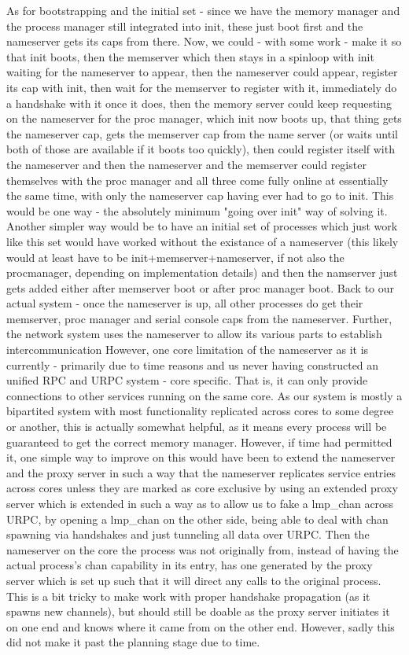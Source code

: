 As for bootstrapping and the initial set - since we have the memory manager and the process manager still integrated into init, these just boot first and the nameserver gets its caps from there. Now, we could - with some work - make it so that init boots, then the memserver which then stays in a spinloop with init waiting for the nameserver to appear, then the nameserver could appear, register its cap with init, then wait for the memserver to register with it, immediately do a handshake with it once it does, then the memory server could keep requesting on the nameserver for the proc manager, which init now boots up, that thing gets the nameserver cap, gets the memserver cap from the name server (or waits until both of those are available if it boots too quickly), then could register itself with the nameserver and then the nameserver and the memserver could register themselves with the proc manager and all three come fully online at essentially the same time, with only the nameserver cap having ever had to go to init. This would be one way - the absolutely minimum "going over init" way of solving it.
Another simpler way would be to have an initial set of processes which just work like this set would have worked without the existance of a nameserver (this likely would at least have to be init+memserver+nameserver, if not also the procmanager, depending on implementation details) and then the namserver just gets added either after memserver boot or after proc manager boot.
Back to our actual system - once the nameserver is up, all other processes do get their memserver, proc manager and serial console caps from the nameserver. Further, the network system uses the nameserver to allow its various parts to establish intercommunication
However, one core limitation of the nameserver as it is currently - primarily due to time reasons and us never having constructed an unified RPC and URPC system - core specific. That is, it can only provide connections to other services running on the same core. As our system is mostly a bipartited system with most functionality replicated across cores to some degree or another, this is actually somewhat helpful, as it means every process will be guaranteed to get the correct memory manager.
However, if time had permitted it, one simple way to improve on this would have been to extend the nameserver and the proxy server in such a way that the nameserver replicates service entries across cores unless they are marked as core exclusive by using an extended proxy server which is extended in such a way as to allow us to fake a lmp\_chan across URPC, by opening a lmp\_chan on the other side, being able to deal with chan spawning via handshakes and just tunneling all data over URPC. Then the nameserver on the core the process was not originally from, instead of having the actual process's chan capability in its entry, has one generated by the proxy server which is set up such that it will direct any calls to the original process.
This is a bit tricky to make work with proper handshake propagation (as it spawns new channels), but should still be doable as the proxy server initiates it on one end and knows where it came from on the other end.
However, sadly this did not make it past the planning stage due to time.